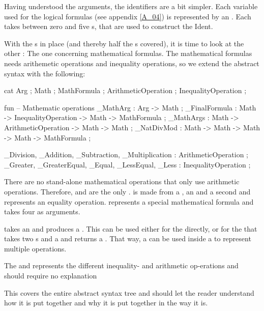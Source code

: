 Having understood the arguments, the identifiers are a bit simpler. Each variable used for the logical formulas (see appendix \ref{A_04}) is represented by an . Each  takes between zero and five s, that are used to construct the Ident.

With the s in place (and thereby half the s covered),  it is time to look at the other : The one concerning mathematical formulas. The mathematical formulas needs arithemetic operations and inequality operations, so we extend the abstract syntax with the following:

\begin{lstgf}
    cat
        Arg ; Math ; MathFormula ; ArithmeticOperation ; InequalityOperation ;

    fun
        -- Mathematic operations
        _MathArg : Arg -> Math ;
        _FinalFormula : Math -> InequalityOperation -> Math -> MathFormula ;
        _MathArgs : Math -> ArithmeticOperation -> Math -> Math ;
        _NatDivMod : Math -> Math -> Math -> Math -> MathFormula ;

        _Division, _Addition, _Subtraction, _Multiplication : ArithmeticOperation ;
        _Greater, _GreaterEqual, _Equal, _LessEqual, _Less : InequalityOperation ;
\end{lstgf}

There are no stand-alone mathematical operations that only use arithmetic operations. Therefore,  and  are the only .  is made from a , an  and a second  and represents an equality operation.  represents a special mathematical formula and takes four  as arguments.

 takes an  and produces a . This can be used either for the  directly, or for the  that takes two s and a  and returns a . That way, a  can be used inside a  to represent multiple operations.

The  and  represents the different inequality- and arithmetic op-erations and should require no explanation

This covers the entire abstract syntax tree and should let the reader understand how it is put together and why it is put together in the way it is.